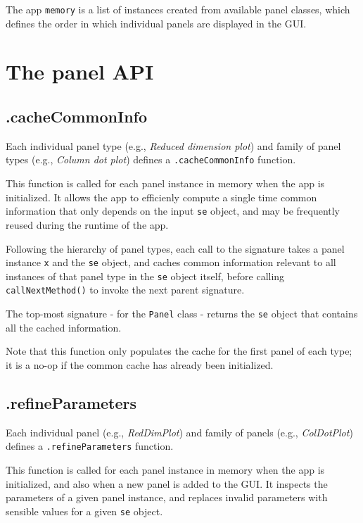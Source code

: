 \documentclass[]{book}
\begin{document}
The app \texttt{memory} is a list of instances created from available panel classes, which defines the order in which individual panels are displayed in the GUI.

\hypertarget{panel-api}{%
\section{The panel API}\label{panel-api}}

\hypertarget{cachecommoninfo}{%
\subsection{.cacheCommonInfo}\label{cachecommoninfo}}

Each individual panel type (e.g., \emph{Reduced dimension plot}) and family of panel types (e.g., \emph{Column dot plot}) defines a \texttt{.cacheCommonInfo} function.

This function is called for each panel instance in memory when the app is initialized.
It allows the app to efficienly compute a single time common information that only depends on the input \texttt{se} object, and may be frequently reused during the runtime of the app.

Following the hierarchy of panel types, each call to the signature takes a panel instance \texttt{x} and the \texttt{se} object, and caches common information relevant to all instances of that panel type in the \texttt{se} object itself, before calling \texttt{callNextMethod()} to invoke the next parent signature.

The top-most signature - for the \texttt{Panel} class - returns the \texttt{se} object that contains all the cached information.

Note that this function only populates the cache for the first panel of each type; it is a no-op if the common cache has already been initialized.

\hypertarget{refineparameters}{%
\subsection{.refineParameters}\label{refineparameters}}

Each individual panel (e.g., \emph{RedDimPlot}) and family of panels (e.g., \emph{ColDotPlot}) defines a \texttt{.refineParameters} function.

This function is called for each panel instance in memory when the app is initialized, and also when a new panel is added to the GUI.
It inspects the parameters of a given panel instance, and replaces invalid parameters with sensible values for a given \texttt{se} object.
\end{document}

